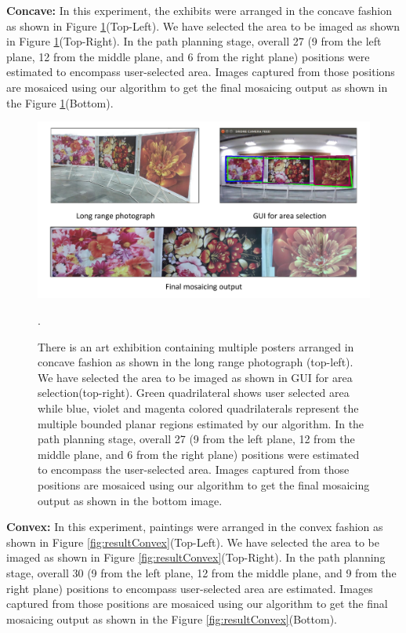 \textbf{Concave:} In this experiment, the exhibits were arranged in the concave
fashion as shown in Figure \ref{fig:resultConcave}(Top-Left). We have selected
the area to be imaged as shown in Figure \ref{fig:resultConcave}(Top-Right). In
the path planning stage, overall 27 (9 from the left plane, 12 from the middle
plane, and 6 from the right plane) positions were estimated to encompass
user-selected area. Images captured from those positions are mosaiced using our
algorithm to get the final mosaicing output as shown in the Figure \ref{fig:resultConcave}(Bottom).

\begin{figure}
\centering
\includegraphics[width=\linewidth]{figures/multiplanar/ConcaveResult.pdf}
\caption[Result: Concave arrangement]{There is an art exhibition containing
multiple posters arranged in concave fashion as shown in the long range photograph (top-left). We have
selected the area to be imaged as shown in GUI for area selection(top-right).
Green quadrilateral shows user selected area while blue, violet and magenta
colored quadrilaterals represent the multiple bounded planar regions
estimated by our algorithm. In the path planning stage, overall 27 (9 from the left
plane, 12 from the middle plane, and 6 from the right plane) positions were
estimated to encompass the user-selected area. Images captured from those
positions are mosaiced using our algorithm to get the final mosaicing output as shown in the bottom image.}
\label{fig:resultConcave}.
\end{figure}

\textbf{Convex:} In this experiment, paintings were arranged in the convex
fashion as shown in Figure \ref{fig:resultConvex}(Top-Left). We have selected
the area to be imaged as shown in Figure \ref{fig:resultConvex}(Top-Right). In
the path planning stage, overall 30 (9 from the left plane, 12 from the middle
plane, and 9 from the right plane) positions to encompass user-selected area are
estimated. Images captured from those positions are mosaiced using our algorithm to get the final
mosaicing output as shown in the Figure \ref{fig:resultConvex}(Bottom).

